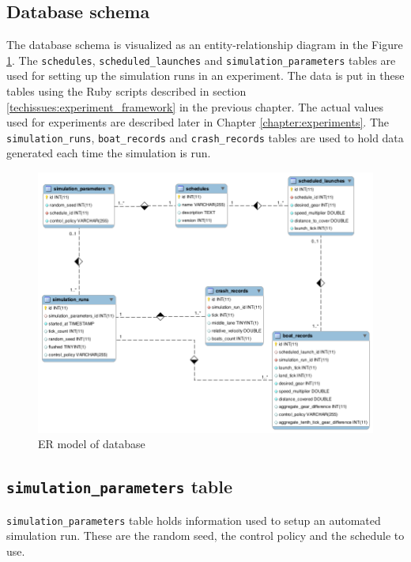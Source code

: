 \subsection{Database schema}\label{software:experiment:db}

The database schema is visualized as an entity-relationship diagram in the Figure
\ref{software:fig:eer}. The \texttt{schedules}, \texttt{scheduled\_launches} and
\texttt{simulation\_parameters} tables are used for setting up the simulation runs in an
experiment. The data is put in these tables using the Ruby scripts described in section \ref{techissues:experiment_framework} in the previous chapter. The actual values used for experiments are described later in Chapter \ref{chapter:experiments}. The \texttt{simulation\_runs}, \texttt{boat\_records} and
\texttt{crash\_records} tables are used to hold data generated each
time the simulation is run.

\begin{figure}
\begin{center}
  \includegraphics[scale=0.5]{images/eer.png}
  \caption{ER model of database}
  \label{software:fig:eer}
\end{center}
\end{figure}

\subsection{\texttt{simulation\_parameters} table}
\texttt{simulation\_parameters} table holds information used to setup
an automated simulation run. These are the random seed, the control
policy and the schedule to use.

